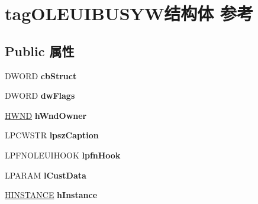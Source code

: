 \hypertarget{structtag_o_l_e_u_i_b_u_s_y_w}{}\section{tag\+O\+L\+E\+U\+I\+B\+U\+S\+Y\+W结构体 参考}
\label{structtag_o_l_e_u_i_b_u_s_y_w}
\subsection*{Public 属性}
\begin{DoxyCompactItemize}
\item 
\mbox{\label{structtag_o_l_e_u_i_b_u_s_y_w_a4044f18daf46a882574e33169b5af93b}} 
D\+W\+O\+RD {\bfseries cb\+Struct}
\item 
\mbox{\label{structtag_o_l_e_u_i_b_u_s_y_w_a76f44d7005de740d2ff31e59a8b2881b}} 
D\+W\+O\+RD {\bfseries dw\+Flags}
\item 
\mbox{\label{structtag_o_l_e_u_i_b_u_s_y_w_a542d5b8f6fc68ac64b9f762b0642dd1a}} 
\hyperlink{interfacevoid}{H\+W\+ND} {\bfseries h\+Wnd\+Owner}
\item 
\mbox{\label{structtag_o_l_e_u_i_b_u_s_y_w_ac06404ab6ced3b43ea96914148cff237}} 
L\+P\+C\+W\+S\+TR {\bfseries lpsz\+Caption}
\item 
\mbox{\label{structtag_o_l_e_u_i_b_u_s_y_w_a101a2730f756b9f9952a638a390f18e8}} 
L\+P\+F\+N\+O\+L\+E\+U\+I\+H\+O\+OK {\bfseries lpfn\+Hook}
\item 
\mbox{\label{structtag_o_l_e_u_i_b_u_s_y_w_a023dd992277333d9f7ec343460331644}} 
L\+P\+A\+R\+AM {\bfseries l\+Cust\+Data}
\item 
\mbox{\label{structtag_o_l_e_u_i_b_u_s_y_w_ab6c4992b690fd6534d1a5be6d790964f}} 
\hyperlink{interfacevoid}{H\+I\+N\+S\+T\+A\+N\+CE} {\bfseries h\+Instance}
\item 
\mbox{\label{structtag_o_l_e_u_i_b_u_s_y_w_a2e544c93c0251b4cb90258491eed2aec}} 

\end{DoxyCompactItemize}
